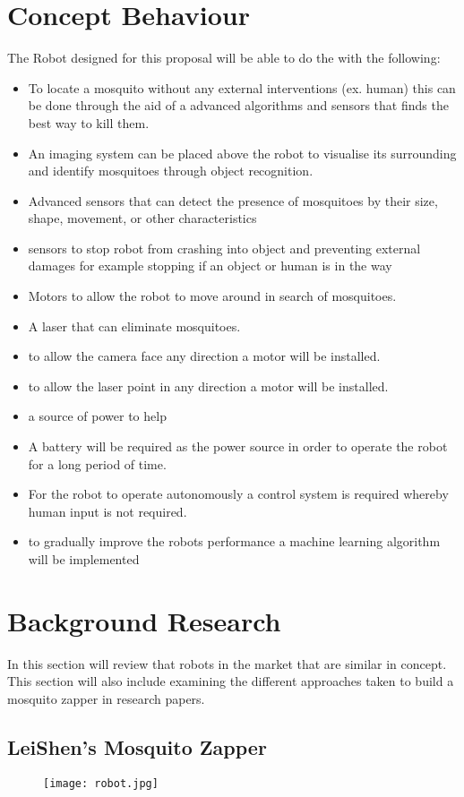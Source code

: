 \documentclass[11pt]{article}
\begin{document}
		\section{Concept Behaviour}
	The Robot designed for this proposal will be able to do the with the following:
	\begin{itemize}
		\item To locate a mosquito without any external interventions (ex. human) this can be done through the aid of a advanced algorithms and sensors that finds the best way to kill them. 
		\item An imaging system can be placed above the robot to visualise its surrounding and identify mosquitoes through object recognition.
		\item Advanced sensors that can detect the presence of mosquitoes by their size, shape, movement, or other characteristics
		\item sensors to  stop robot from crashing into object and preventing external damages for example stopping if an object or human is in the way 
		\item Motors to allow the robot to move around in search of mosquitoes.
		\item A laser that can eliminate mosquitoes.
		\item to allow the camera face any direction a motor will be installed.
		\item to allow the laser point in any direction a motor will be installed.
		\item a source of power to help 
		\item A battery will be required as the power source in order to operate the robot for a long period of time.
		\item For the robot to operate autonomously a control system is required whereby human input is not required.
		\item to gradually improve the robots performance a machine learning algorithm will be implemented
		
	\end{itemize}
	
	
	\section{Background Research}
In this section will review that robots in the market that are similar in concept. This section will also include examining the different approaches taken to build a mosquito zapper  in research papers.
 	\subsection{LeiShen's Mosquito Zapper}
 	  \begin{center}
 	\begin{figure}[H]
 		\centering
 		\texttt{[image: robot.jpg]}
 		
 	\end{figure}
 \end{center}
 
\end{document}
